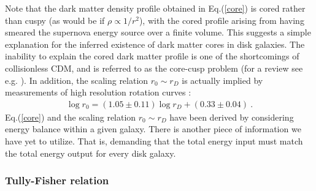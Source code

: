 \documentclass[12pt]{article}
\begin{document}
{{Note that the dark matter density profile obtained in Eq.(\ref{core}) is
cored rather than 
cuspy (as would be if $\rho \propto 1/r ^2$), with the cored profile
arising from having smeared the supernova energy source 
over a finite volume. This suggests a simple explanation for the
inferred existence of dark matter cores in disk galaxies. The 
inability to explain the cored dark matter profile is one of the
shortcomings of collisionless CDM, and is referred 
to as the core-cusp problem (for a review see e.g. \cite{deblok}). In
addition, the scaling relation $r _0 \sim r_D$ 
is actually implied by measurements of high resolution rotation curves
\cite{donato}:
%
\begin{eqnarray}
\log r _0 = (1.05 \pm 0.11) \log r_D + (0.33 \pm 0.04) \ .
\end{eqnarray}
%
Eq.(\ref{core}) and the scaling relation $r _0 \sim r _D$ have been
derived by considering energy balance within a given galaxy. 
There is another piece of information we have yet to utilize. That is,
demanding that the total energy input must 
match the total energy output for every disk galaxy.



\subsubsection{Tully-Fisher relation}

}}
\end{document}

